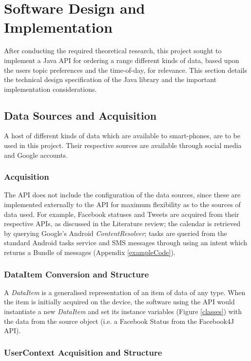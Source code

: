 \chapter{Software Design and Implementation}

After conducting the required theoretical research, this project sought to implement a Java API for ordering a range different kinds of data, based upon the users topic preferences and the time-of-day, for relevance. This section details the technical design specification of the Java library and the important implementation considerations.

\section{Data Sources and Acquisition}

A host of different kinds of data which are available to smart-phones, are to be used in this project. Their respective sources are available through social media and Google accounts. 

\subsection{Acquisition}

The API does not include the configuration of the data sources, since these are implemented externally to the API for maximum flexibility as to the sources of data used. For example, Facebook statuses \cite{Facebook4JExample} and Tweets \cite{Twitter4JExample} are acquired from their respective APIs, as discussed in the Literature review; the calendar is retrieved by querying Google's Android \emph{ContentResolver}; tasks are queried from the standard Android tasks service and SMS messages through using an intent which returns a Bundle of messages (Appendix \ref{exampleCode}). 

\subsection{DataItem Conversion and Structure}

A \emph{DataItem} is a generalised representation of an item of data of any type. When the item is initially acquired on the device, the software using the API would instantiate a new \emph{DataItem} and set its instance variables (Figure \ref{classes}) with the data from the source object (i.e. a Facebook Status from the Facebook4J API). 

\subsection{UserContext Acquisition and Structure}

